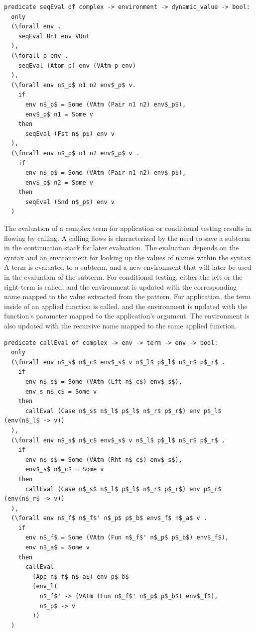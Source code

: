 \documentclass[10pt]{article}
\begin{document}
\begin{lstlisting}[language=logic, mathescape]
  predicate seqEval of complex -> environment -> dynamic_value -> bool:
  only
  (\forall env . 
    seqEval Unt env VUnt
  ),
  (\forall p env .
    seqEval (Atom p) env (VAtm p env)
  ),
  (\forall env n$_p$ n1 n2 env$_p$ v. 
    if
      env n$_p$ = Some (VAtm (Pair n1 n2) env$_p$),
      env$_p$ n1 = Some v
    then
      seqEval (Fst n$_p$) env v
  ),
  (\forall env n$_p$ n1 n2 env$_p$ v . 
    if
      env n$_p$ = Some (VAtm (Pair n1 n2) env$_p$), 
      env$_p$ n2 = Some v 
    then
      seqEval (Snd n$_p$) env v
  )
  \end{lstlisting}

The evaluation of a complex term for application or conditional testing
results in flowing by calling. A calling flows is characterized
by the need to save a subterm in the continuation stack for later evaluation.
The evaluation depends on the syntax
and an environment for looking up the values of names within the syntax.
A term is evaluated to a subterm, and a new environment that will
later be used in the evaluation of the subterm. For conditional testing, either the left or the right
term is called, and the environment is updated with the corresponding name mapped to the
value extracted from the pattern. For application, the term inside of an applied function 
is called, and the environment is updated with the function's parameter mapped to the
application's argument. The environment is also updated with the recursive name mapped to the
same applied function.

\begin{lstlisting}[language=logic, mathescape]
  predicate callEval of complex -> env -> term -> env -> bool:
  only
  (\forall env n$_s$ n$_c$ env$_s$ v n$_l$ p$_l$ n$_r$ p$_r$ .
    if
      env n$_s$ = Some (VAtm (Lft n$_c$) env$_s$),
      env_s n$_c$ = Some v
    then
      callEval (Case n$_s$ n$_l$ p$_l$ n$_r$ p$_r$) env p$_l$ (env(n$_l$ -> v))
  ),
  (\forall env n$_s$ n$_c$ env$_s$ v n$_l$ p$_l$ n$_r$ p$_r$ .
    if 
      env n$_s$ = Some (VAtm (Rht n$_c$) env$_s$),
      env$_s$ n$_c$ = Some v
    then
      callEval (Case n$_s$ n$_l$ p$_l$ n$_r$ p$_r$) env p$_r$ (env(n$_r$ -> v))
  ),
  (\forall env n$_f$ n$_f$' n$_p$ p$_b$ env$_f$ n$_a$ v .
    if 
      env n$_f$ = Some (VAtm (Fun n$_f$' n$_p$ p$_b$) env$_f$),
      env n$_a$ = Some v
    then
      callEval
        (App n$_f$ n$_a$) env p$_b$
        (env_l(
          n$_f$' -> (VAtm (Fun n$_f$' n$_p$ p$_b$) env$_f$),
          n$_p$ -> v
        ))
  )
\end{lstlisting}
  
\end{document}
